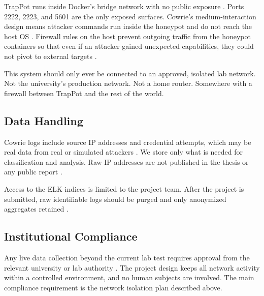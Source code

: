 TrapPot runs inside Docker's bridge network with no public exposure \cite{albaseer2024fedpot,fan2019honeydoc}. Ports 2222, 2223, and 5601 are the only exposed surfaces. Cowrie's medium-interaction design means attacker commands run inside the honeypot and do not reach the host OS \cite{9071014,9359711}. Firewall rules on the host prevent outgoing traffic from the honeypot containers so that even if an attacker gained unexpected capabilities, they could not pivot to external targets \cite{commey2025blockchain}.

This system should only ever be connected to an approved, isolated lab network. Not the university's production network. Not a home router. Somewhere with a firewall between TrapPot and the rest of the world.

\subsection{Data Handling}
\label{subsec:data_handling}

Cowrie logs include source IP addresses and credential attempts, which may be real data from real or simulated attackers \cite{rodriguezgomez2025systematic,lee2021classification}. We store only what is needed for classification and analysis. Raw IP addresses are not published in the thesis or any public report \cite{franco2021survey,rodriguezgomez2025systematic}.

Access to the ELK indices is limited to the project team. After the project is submitted, raw identifiable logs should be purged and only anonymized aggregates retained \cite{9001068,rodriguezgomez2025systematic}.

\subsection{Institutional Compliance}
\label{subsec:regulatory_compliance}

Any live data collection beyond the current lab test requires approval from the relevant university or lab authority \cite{franco2021survey,alawadi2022_iot_honeypots}. The project design keeps all network activity within a controlled environment, and no human subjects are involved. The main compliance requirement is the network isolation plan described above.

